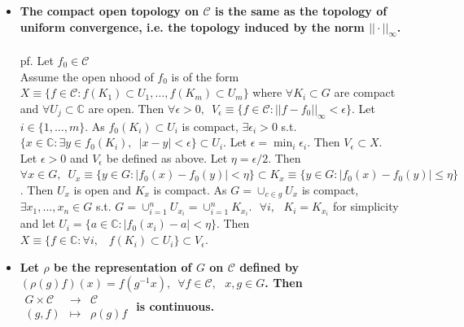 \documentclass[12pt,letterpaper]{report}
\begin{document}
\begin{itemize}\item\textbf{The compact open topology on $\mathcal{C}$ is the same as the topology of uniform convergence, i.e. the topology induced by the norm $||\cdot||_{\infty}$.}
\\\\pf. Let $f_{0}\in\mathcal{C}$ 
\\Assume the open nhood of $f_{0}$ is of the form $X\equiv\{f\in\mathcal{C}:f(K_{1})\subset U_{1},\dots,f(K_{m})\subset U_{m}\}$ where $\forall K_{i}\subset G$ are compact and $\forall U_{j}\subset\mathbb{C}$ are open. Then $\forall \epsilon>0,\,\,\,V_{\epsilon}\equiv\{f\in\mathcal{C}:||f-f_{0}||_{\infty}<\epsilon\}$. Let $i\in\{1,\dots,m\}$. As $f_{0}(K_{i})\subset U_{i}$ is compact, $\exists \epsilon_{i}>0$ s.t. $\{x\in\mathbb{C}:\exists y\in f_{0}(K_{i}),\,\,\,|x-y|<\epsilon\}\subset U_{i}$. Let $\epsilon=\min_{i}\epsilon_{i}$. Then $V_{\epsilon}\subset X$. 
\\Let $\epsilon>0$ and $V_{\epsilon}$ be defined as above. Let $\eta=\epsilon/2$. Then $\forall x\in G,\,\,\,U_{x}\equiv\{y\in G:|f_{0}(x)-f_{0}(y)|<\eta\}\subset K_{x}\equiv\{y\in G:|f_{0}(x)-f_{0}(y)|\leq \eta\}$. Then $U_{x}$ is open and $K_{x}$ is compact. As $G=\cup_{c\in g}U_{x}$ is compact, $\exists x_{1},\dots,x_{n}\in G$ s.t. $G=\cup_{i=1}^{n}U_{x_{i}}=\cup_{i=1}^{n}K_{x_{i}}.\,\,\,\,\forall i,\,\,\,\,K_{i}=K_{x_{i}}$ for simplicity and let $U_{i}=\{a\in\mathbb{C}:|f_{0}(x_{i})-a|<\eta\}$. Then $X\equiv\{f\in\mathbb{C}:\forall i,\,\,\,\,\,f(K_{i})\subset U_{i}\}\subset V_{\epsilon}$.
\item \textbf{Let $\rho$ be the representation of $G$ on $\mathcal{C}$ defined by $(\rho(g)f)(x)=f(g^{-1}x),\,\,\,\forall f\in\mathcal{C},\,\,\,\,x,g\in G$. Then $\begin{array}{rrr}G\times \mathcal{C}&\rightarrow&\mathcal{C}\\(g,f)&\mapsto&\rho(g)f\end{array}$ is continuous.}

\end{itemize}
\end{document}
